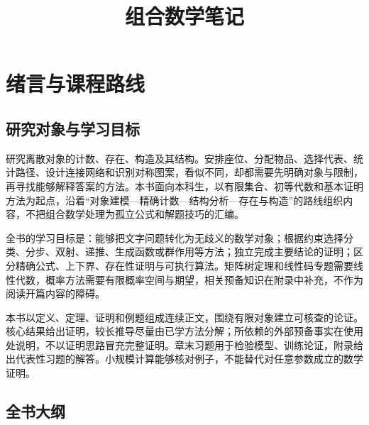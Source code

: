\documentclass[UTF8,12pt,a4paper,fontset=fandol]{ctexbook}
\title{组合数学笔记}
\author{}
\date{}
\begin{document}
\maketitle
\frontmatter
\tableofcontents

\chapter{绪言与课程路线}
\label{ch:course-outline}

\section{研究对象与学习目标}

研究离散对象的计数、存在、构造及其结构。安排座位、分配物品、选择代表、统计路径、设计连接网络和识别对称图案，看似不同，却都需要先明确对象与限制，再寻找能够解释答案的方法。本书面向本科生，以有限集合、初等代数和基本证明方法为起点，沿着“对象建模---精确计数---结构分析---存在与构造”的路线组织内容，不把组合数学处理为孤立公式和解题技巧的汇编。

全书的学习目标是：能够把文字问题转化为无歧义的数学对象；根据约束选择分类、分步、双射、递推、生成函数或群作用等方法；独立完成主要结论的证明；区分精确公式、上下界、存在性证明与可执行算法。矩阵树定理和线性码专题需要线性代数，概率方法需要有限概率空间与期望，相关预备知识在附录中补充，不作为阅读开篇内容的障碍。

本书以定义、定理、证明和例题组成连续正文，围绕有限对象建立可核查的论证。核心结果给出证明，较长推导尽量由已学方法分解；所依赖的外部预备事实在使用处说明，不以证明思路冒充完整证明。章末习题用于检验模型、训练论证，附录给出代表性习题的解答。小规模计算能够核对例子，不能替代对任意参数成立的数学证明。

\section{全书大纲}
\end{document}
